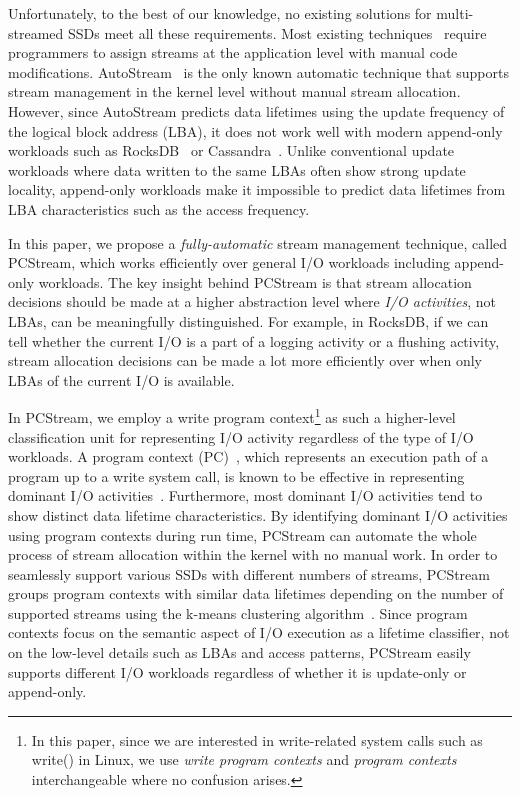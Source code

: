 Unfortunately, to the best of our knowledge, no existing solutions  for
multi-streamed SSDs meet all these requirements.  
Most existing techniques~\cite{MultiStream, Level, vStream, FStream} require 
programmers to assign streams at the application level with manual code modifications.
\textsf{\small AutoStream}~\cite{AutoStream} is the only known automatic technique 
that supports stream management in the kernel level without manual stream allocation.
However, since \textsf{\small AutoStream} predicts data lifetimes using the update frequency 
of the logical block address (LBA), it does not work well with modern append-only workloads 
such as RocksDB~\cite{RocksDB} or Cassandra~\cite{Cassandra}.  
Unlike conventional update workloads where data written to the same LBAs 
often show strong update locality, 
append-only workloads make it impossible to predict data lifetimes 
from LBA characteristics such as the access frequency.

In this paper, we propose a {\it fully-automatic} stream management technique, 
called \textsf{\small PCStream}, which works efficiently over general I/O workloads including 
append-only workloads.   
The key insight behind \textsf{\small PCStream} is that stream allocation decisions should be made 
at a higher abstraction level where {\it I/O activities}, not LBAs, can be meaningfully distinguished.
For example, in RocksDB, if we can tell whether the current I/O is a part of 
a logging activity or a flushing activity, stream allocation decisions can be made 
a lot more efficiently over when only LBAs of the current I/O is
available.   

In \textsf{\small PCStream}, we employ a write program context\footnote{In this paper, since we are 
interested in write-related system calls such as write() in Linux, 
we use {\it write program contexts} and {\it
program contexts} interchangeable where no confusion arises.} as such a higher-level 
classification unit for representing I/O activity regardless of the type of I/O workloads. 
A program context (PC)~\cite{PC, PC2}, which represents an execution path of a program 
up to a write system call,
is known to be effective in 
representing dominant I/O activities~\cite{PCHa}.  
Furthermore, most dominant I/O activities tend to show distinct data lifetime characteristics.
By identifying dominant I/O activities using program contexts during run time, 
\textsf{\small PCStream} can automate the whole process of stream allocation within the 
kernel with no manual work.  In order to
seamlessly support various SSDs with different numbers of streams, \textsf{\small PCStream} 
groups program contexts with similar data lifetimes 
depending on the number of supported streams
using the k-means clustering algorithm~\cite{kmeans}. 
Since program contexts focus on the semantic aspect of I/O execution as a lifetime
classifier, not on the low-level details such as LBAs and access patterns, 
\textsf{\small PCStream} easily 
supports different I/O workloads regardless of whether it is update-only or append-only.   

